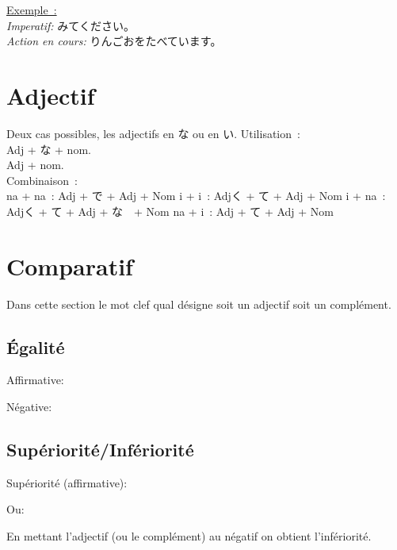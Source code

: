 \documentclass{article}
\begin{document}
\begin{CJK}{UTF8}{min}
\par
\underline{Exemple~:} \\
\textit{Imperatif:} みてください。\\
\textit{Action en cours:} りんごおをたべています。

\end{CJK}
\section{Adjectif}
\begin{CJK}{UTF8}{min}
Deux cas possibles, les adjectifs en な ou en い.
Utilisation~:\\
Adj + な + nom. \\
Adj + nom. \\

Combinaison~:\\
na + na~: Adj + で + Adj + Nom
i + i~: Adjく + て + Adj + Nom
i + na~: Adjく + て + Adj + な　+ Nom
na + i~: Adj	+ て + Adj + Nom
\end{CJK}
\section{Comparatif}
Dans cette section le mot clef qual désigne soit un adjectif soit un complément.
\begin{CJK}{UTF8}{min}
\subsection{\'{E}galité}
Affirmative:
\begin{center}
\end{center}
Négative:
\begin{center}
\end{center}
\subsection{Supériorité/Infériorité}
Supériorité (affirmative):
\begin{center}
\end{center}
Ou:
\begin{center}
\end{center}
En mettant l'adjectif (ou le complément) au négatif on obtient l'infériorité.
\end{CJK}
\end{document}
